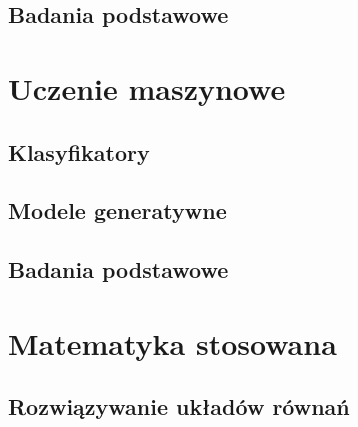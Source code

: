 \documentclass[a4paper,11pt]{article}
\begin{document}
\subsection{Badania podstawowe}


\newpage 

\section{Uczenie maszynowe}

\subsection{Klasyfikatory}


\subsection{Modele generatywne}

\subsection{Badania podstawowe}
\newpage 

\section{Matematyka stosowana}

\subsection{Rozwiązywanie układów równań}
\end{document}
